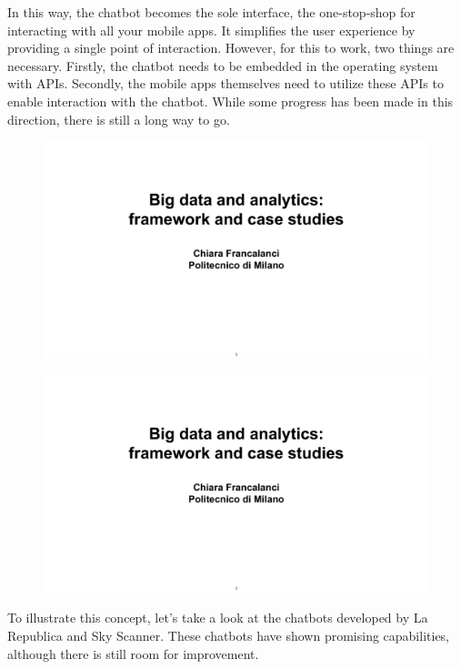 In this way, the chatbot becomes the sole interface, the one-stop-shop
for interacting with all your mobile apps. It simplifies the user
experience by providing a single point of interaction. However, for this
to work, two things are necessary. Firstly, the chatbot needs to be
embedded in the operating system with APIs. Secondly, the mobile apps
themselves need to utilize these APIs to enable interaction with the
chatbot. While some progress has been made in this direction, there is
still a long way to go.

\begin{figure}[!h]
    \centering
    \includegraphics[page=14, trim = 1.5cm 4cm 1.5cm 4.5cm, clip, width=\textwidth]{images/06 - BIG_DATA.pdf}
\end{figure}

\begin{figure}[!h]
    \centering
    \includegraphics[page=15, trim = 1.5cm 3cm 1.5cm 5cm, clip, width=\textwidth]{images/06 - BIG_DATA.pdf}
\end{figure}

To illustrate this concept, let's take a look at the chatbots developed
by La Republica and Sky Scanner. These chatbots have shown promising
capabilities, although there is still room for improvement.

